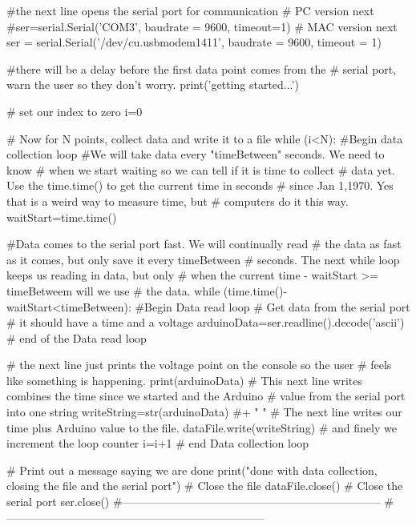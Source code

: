\begin{python}
 
#the next line opens the serial port for communication
#  PC version next
#ser=serial.Serial('COM3', baudrate = 9600, timeout=1)
#  MAC version next
ser = serial.Serial('/dev/cu.usbmodem1411', baudrate = 9600, timeout = 1)

 
#there will be a delay before the first data point comes from the 
#  serial port, warn the user so they don't worry.
print('getting started...')
 
# set our index to zero
i=0
 
 
# Now for N points, collect data and write it to a file
while (i<N):    #Begin data collection loop
    #We will take data every "timeBetween" seconds. We need to know 
    #   when we start waiting so we can tell if it is time to collect 
    #   data yet. Use the time.time() to get the current time in seconds
    #   since Jan 1,1970. Yes that is a weird way to measure time, but 
    #   computers do it this way.
    waitStart=time.time()
    
    #Data comes to the serial port fast. We will continually read 
    #  the data as fast as it comes, but only save it every timeBetween
    #  seconds. The next while loop keeps us reading in data, but only 
    #  when the current time - waitStart >= timeBetweem will we use 
    #  the data.
    while (time.time()-waitStart<timeBetween): #Begin Data read loop
         # Get data from the serial port
         # it should have a time and a voltage
         arduinoData=ser.readline().decode('ascii')
         # end of the Data read loop
         
    # the next line just prints the voltage point on the console so the user 
    # feels like something is happening.
    print(arduinoData)
    # This next line writes combines the time since we started and the Arduino 
    # value from the serial port into one string
    writeString=str(arduinoData) #+ " \n"
    # The next line writes our time plus Arduino value to the file.
    dataFile.write(writeString)
    # and finely we increment the loop counter
    i=i+1      # end Data collection loop   
    
# Print out a message saying we are done
print("done with data collection, closing the file and the serial port")
# Close the file
dataFile.close()
# Close the serial port   
ser.close() 
#---------------------------------------------------------------------
#---------------------------------------------------------------------
\end{python}

